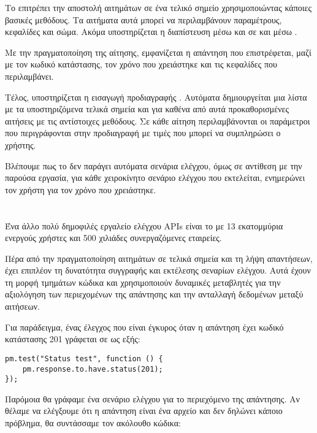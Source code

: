 Το  επιτρέπει την αποστολή αιτημάτων σε ένα τελικό σημείο 
χρησιμοποιώντας κάποιες βασικές  μεθόδους.
Τα αιτήματα αυτά μπορεί να περιλαμβάνουν παραμέτρους, κεφαλίδες και σώμα.
Ακόμα υποστηρίζεται η διαπίστευση μέσω  και  σε  και μέσω .

Με την πραγματοποίηση της αίτησης,
εμφανίζεται η απάντηση που επιστρέφεται,
μαζί με τον κωδικό κατάστασης,
τον χρόνο που χρειάστηκε 
και τις κεφαλίδες που περιλαμβάνει.

Τέλος, υποστηρίζεται η εισαγωγή προδιαγραφής .
Αυτόματα δημιουργείται μια λίστα με τα υποστηριζόμενα τελικά σημεία 
και για καθένα από αυτά προκαθορισμένες αιτήσεις με τις αντίστοιχες μεθόδους.
Σε κάθε αίτηση περιλαμβάνονται οι παράμετροι που περιγράφονται στην προδιαγραφή
με τιμές που μπορεί να συμπληρώσει ο χρήστης.

Βλέπουμε πως το  δεν παράγει αυτόματα σενάρια ελέγχου,
όμως σε αντίθεση με την παρούσα εργασία,
για κάθε χειροκίνητο σενάριο ελέγχου που εκτελείται, 
ενημερώνει τον χρήστη για τον χρόνο που χρειάστηκε.

\section{}

Ένα άλλο πολύ δημοφιλές εργαλείο ελέγχου APIs είναι το  με 13 εκατομμύρια ενεργούς χρήστες και 500 χιλιάδες συνεργαζόμενες εταιρείες.

Πέρα από την πραγματοποίηση αιτημάτων σε τελικά σημεία και τη λήψη απαντήσεων,
έχει επιπλέον τη δυνατότητα συγγραφής και εκτέλεσης σεναρίων ελέγχου.
Αυτά έχουν τη μορφή τμημάτων κώδικα  
και χρησιμοποιούν δυναμικές μεταβλητές 
για την αξιολόγηση των περιεχομένων της απάντησης  
και την ανταλλαγή δεδομένων μεταξύ αιτήσεων.

Για παράδειγμα,
ένας έλεγχος που είναι έγκυρος όταν η απάντηση έχει κωδικό κατάστασης 201 γράφεται σε  ως εξής:

\begin{lstlisting}
pm.test("Status test", function () {
    pm.response.to.have.status(201);
});
\end{lstlisting}

Παρόμοια θα γράφαμε ένα σενάριο ελέγχου για το περιεχόμενο της απάντησης.
Αν θέλαμε να ελέγξουμε ότι η απάντηση είναι ένα αρχείο  και δεν δηλώνει κάποιο πρόβλημα,
θα συντάσσαμε τον ακόλουθο κώδικα:

